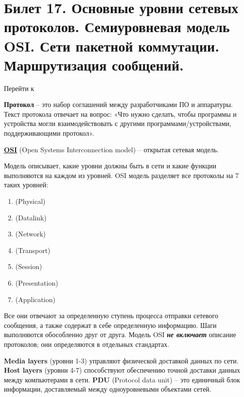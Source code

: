 \newpage
\section{Билет 17. Основные уровни сетевых протоколов. Семиуровневая модель OSI. Сети пакетной коммутации. Маршрутизация сообщений.}\label{b17:part1}

Перейти к~

\textbf{Протокол} -- это набор соглашений между разработчиками ПО и аппаратуры. Текст протокола отвечает на вопрос: «Что нужно сделать, чтобы программы и устройства могли взаимодействовать с другими программами/устройствами, поддерживающими протокол».

\href{https://clck.ru/BmJYw}{\textbf{OSI}} (Open Systems Interconnection model) -- открытая сетевая модель.

Модель описывает, какие уровни должны быть в сети и какие функции выполняются на каждом из уровней. OSI модель разделяет все протоколы на 7 таких уровней:
\begin{enumerate}
\item {} (Physical)
\item {} (Datalink)
\item {} (Network)
\item {} (Transport)
\item {} (Session)
\item {} (Presentation)
\item {} (Application)
\end{enumerate}

Все они отвечают за определенную ступень процесса отправки сетевого сообщения, а также содержат в себе определенную информацию. Шаги выполняются обособленно друг от друга. Модель OSI \textbf{\textit{не включает}} описание протоколов; они определяются в отдельных стандартах.
\medskip

\noindent \textbf{Media layers} (уровни 1-3) управляют физической доставкой данных по сети. \newline
\noindent \textbf{Host layers} (уровни 4-7) способствуют обеспечению точной доставки данных между компьютерами в сети. \newline
\noindent \textbf{PDU} (Protocol data unit) -- это единичный блок информации, доставляемый между одноуровневыми объектами сетей. \newline


